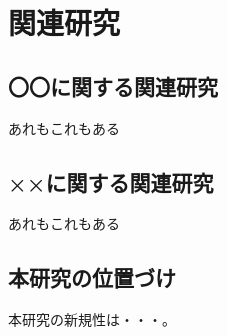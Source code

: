 \chapter{関連研究}

\section{〇〇に関する関連研究}
あれもこれもある

\section{××に関する関連研究}
あれもこれもある

\section{本研究の位置づけ}
本研究の新規性は・・・。